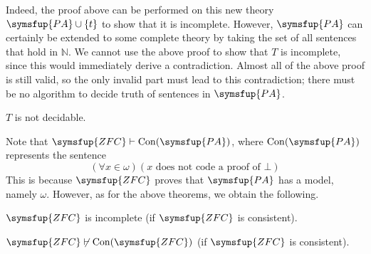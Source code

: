 Indeed, the proof above can be performed on this new theory \( \symsfup{PA} \cup \qty{t} \) to show that it is incomplete.
However, \( \symsfup{PA} \) can certainly be extended to some complete theory by taking the set of all sentences that hold in \( \mathbb N \).
We cannot use the above proof to show that \( T \) is incomplete, since this would immediately derive a contradiction.
Almost all of the above proof is still valid, so the only invalid part must lead to this contradiction; there must be no algorithm to decide truth of sentences in \( \symsfup{PA} \).
\begin{theorem}
    \( T \) is not decidable.
\end{theorem}
Note that \( \symsfup{ZFC} \vdash \mathrm{Con}(\symsfup{PA}) \), where \( \mathrm{Con}(\symsfup{PA}) \) represents the sentence
\[ (\forall x \in \omega)(x \text{ does not code a proof of } \bot) \]
This is because \( \symsfup{ZFC} \) proves that \( \symsfup{PA} \) has a model, namely \( \omega \).
However, as for the above theorems, we obtain the following.
\begin{theorem}
    \( \symsfup{ZFC} \) is incomplete (if \( \symsfup{ZFC} \) is consistent).
\end{theorem}
\begin{theorem}
    \( \symsfup{ZFC} \not\vdash \mathrm{Con}(\symsfup{ZFC}) \) (if \( \symsfup{ZFC} \) is consistent).
\end{theorem}
